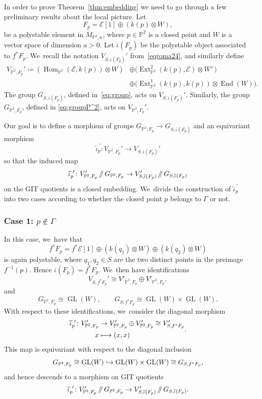 \documentclass[JEP,XML,SOM,Unicode,published]{cedram}
\newcommand\mto{\mathchoice{\longmapsto}{\mapsto}{\mapsto}{\mapsto}}
\newcommand\hto{\mathrel{\lhook\joinrel\to}}
\providecommand\sslash{\mathop{/\mkern-5.5mu/}}
\newcommand{\PP}{{\mathbb P}}\let\P\PP
\newcommand\cE{\mathcal{E}}
\DeclareMathOperator{\End}{End}
\DeclareMathOperator{\Ext}{Ext}
\DeclareMathOperator{\GL}{GL}
\DeclareMathOperator{\Hom}{Hom}
\theoremstyle{definition}
\begin{document}
In order to prove Theorem~\ref{thm:embedding} we need to go through a few preliminary results about the local picture.
Let
\[
F_p = \cE[1] \oplus(k(p)\otimes W),
\]
be a polystable element in $\overline{M}_{\PP^2,n}$, where $p\in \PP^2$ is a closed point and $W$ is a vector space of dimension $a>0$.
Let $\overline{\iota}(F_p)$ be the polystable object associated to $f^*F_p$. We~recall the notation $V_{S,\overline{\iota}(F_p)}'$ from~\eqref{eqroma24}, and similarly define
\begin{equation}\label{eq:VPprime}
\begin{split}
V_{\PP^2,F_p}' \coloneqq \left(\Hom_{\PP^2}(\cE,k(p))\otimes W\right) &\oplus \bigl(\Ext^2_{\PP^2}(k(p),\cE)\otimes W^\vee\bigr)\\
&\oplus \bigl(\Ext^1_{\PP^2}(k(p),k(p))\otimes \End(W)\bigr).
\end{split}
\end{equation}
The group $G_{S,\overline{\iota}(F_p)}$, defined in~\eqref{eq:group}, acts on $V_{S,\overline{\iota}(F_p)}'$. Similarly, the group $G_{\PP^2,F_p}$, defined in \eqref{eq:groupP^2}, acts on $V_{\PP^2,F_p}'$.

Our goal is to define a morphism of groups $G_{\PP^2,F_p}\to G_{S,\overline{\iota}(F_p)}$ and an equivariant morphism
\[
\widetilde{\iota}_p^{\ \prime}\colon V_{\PP^2,F_p}'\to V_{S,\overline{\iota}(F_p)}'
\]
so that the induced map
\[
\widehat{\iota}_p^{\ \prime}\colon V_{\PP^2,F_p}'\sslash G_{\P^2,F_p} \to V_{S,\overline{\iota}(F_p)}'\sslash G_{S,\overline{\iota}(F_p)}
\]
on the GIT quotients is a closed embedding. We~divide the construction of $\widetilde{\iota}_p^{\ \prime}$ into two cases according to whether the closed point $p$ belongs to $\mathsf{\Gamma}$ or not.

\subsubsection*{Case 1: $p\not\in\mathsf{\Gamma}$}
In this case, we~have that
\[
f^*F_p=f^*\cE [1] \oplus \left(k(q_1)\otimes W \right) \oplus \left(k(q_2)\otimes W \right)
\]
is again polystable, where $q_1,q_2\in S$ are the two distinct points in the preimage $f^{-1}(p)$. Hence $\overline{\iota}(F_p)=f^*F_p$. We~then have identifications
\[
V_{S,f^*F_p}' \cong V'_{\PP^2,F_p} \oplus V'_{\PP^2,F_p},
\]
and
\[
G_{\P^2,F_p}\cong \GL(W), \qquad G_{S,f^*F_p} \cong \GL(W) \times \GL(W).
\]
With respect to these identifications, we~consider the diagonal morphism
\begin{equation}\label{eq:DefOfIotaTilde}
\begin{aligned}
\widetilde{\iota}_p^{\ \prime}\colon V'_{\PP^2,F_p} & \to V'_{\PP^2,F_p} \oplus V'_{\PP^2,F_p} \cong V_{S,f^*F_p}' \\
\ x & \mto (x,x)
\end{aligned}.
\end{equation}
This map is equivariant with respect to the diagonal inclusion
\[
G_{\P^2,F_p}\cong \GL(W) \hto \GL(W) \times \GL(W) \cong G_{S,f^*F_p},
\]
and hence descends to a morphism on GIT quotients
\[
\widehat{\iota}_p^{\ \prime} \colon V_{\PP^2,F_p}'\sslash G_{\P^2,F_p} \to V_{S,\overline{\iota}(F_p)}'\sslash G_{S,\overline{\iota}(F_p)}.
\]
\end{document}
